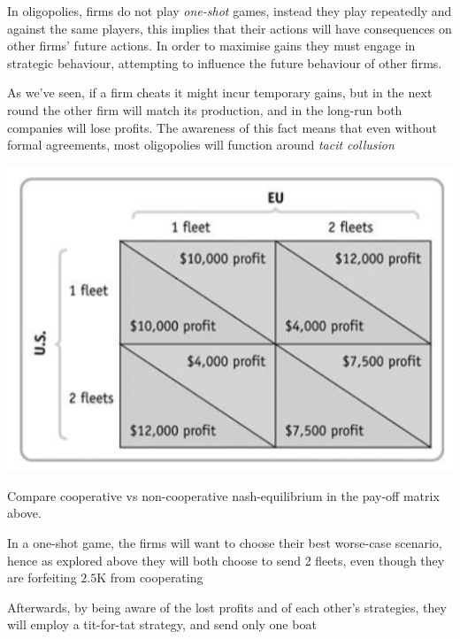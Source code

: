 \documentclass[english,course]{Notes}
\newcommand{\ita}[1]{\textit{#1}}
\begin{document}

\par{In oligopolies, firms do not play \ita{one-shot} games, instead they play repeatedly and against the same players, this implies that their actions will have consequences on other firms' future actions. In order to maximise gains they must engage in strategic behaviour, attempting to influence the future behaviour of other firms.}
\par{As we've seen, if a firm cheats it might incur temporary gains, but in the next round the other firm will match its production, and in the long-run both companies will lose profits. The awareness of this fact means that even without formal agreements, most oligopolies will function around \ita{tacit collusion}}


\includegraphics[width=\textwidth]{g3}

\par{Compare cooperative vs non-cooperative nash-equilibrium in the pay-off matrix above.}
\par{In a one-shot game, the firms will want to choose their best worse-case scenario, hence as explored above they will both choose to send 2 fleets, even though they are forfeiting $2.5$K from cooperating}
\par{Afterwards, by being aware of the lost profits and of each other's strategies, they will employ a tit-for-tat strategy, and send only one boat}
\end{document}
